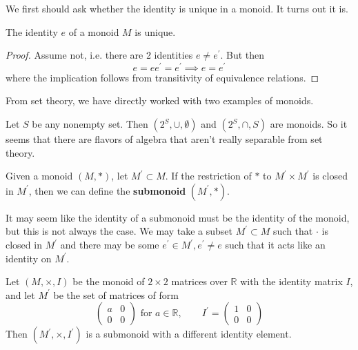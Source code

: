   We first should ask whether the identity is unique in a monoid. It turns out it is. 

  \begin{lemma}
    The identity $e$ of a monoid $M$ is unique. 
  \end{lemma}
  \begin{proof}
    Assume not, i.e. there are 2 identities $e \neq e^\prime$. But then 
    \begin{equation}
      e = e e^\prime = e^\prime \implies e = e^\prime
    \end{equation}
    where the implication follows from transitivity of equivalence relations. 
  \end{proof} 

  From set theory, we have directly worked with two examples of monoids. 

  \begin{example}
    Let $S$ be any nonempty set. Then $(2^S, \cup, \emptyset)$ and $(2^S, \cap, S)$ are monoids. So it seems that there are flavors of algebra that aren't really separable from set theory. 
  \end{example}

  \begin{definition}[Submonoid]
    Given a monoid $(M, \ast)$, let $M^\prime \subset M$. If the restriction of $\ast$ to $M^\prime \times M^\prime$ is closed in $M^\prime$, then we can define the \textbf{submonoid} $(M^\prime, \ast)$. 
  \end{definition} 

  It may seem like the identity of a submonoid must be the identity of the monoid, but this is not always the case. We may take a subset $M^\prime \subset M$ such that $\cdot$ is closed in $M^\prime$ and there may be some $e^\prime \in M^\prime, e^\prime \neq e$ such that it acts like an identity on $M^\prime$. 

  \begin{example}
    Let $(M, \times, I)$ be the monoid of $2 \times 2$ matrices over $\mathbb{R}$ with the identity matrix $I$, and let $M^\prime$ be the set of matrices of form 
    \begin{equation}
      \begin{pmatrix} a & 0 \\ 0 & 0 \end{pmatrix} \text{ for } a \in \mathbb{R}, \qquad I^\prime = \begin{pmatrix} 1 & 0 \\ 0 & 0 \end{pmatrix}
    \end{equation}
    Then $(M^\prime, \times, I^\prime)$ is a submonoid with a different identity element. 
  \end{example}

